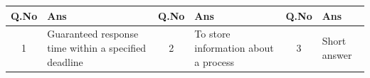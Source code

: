 \documentclass{article}
\begin{document}
\begin{table}[h]
\begin{tabular}{|c|>{\raggedright\arraybackslash}p{3cm}||c|>{\raggedright\arraybackslash}p{3cm}||c|>{\raggedright\arraybackslash}p{3cm}|}
\hline
\textbf{Q.No} & \textbf{Ans} & \textbf{Q.No} & \textbf{Ans} & \textbf{Q.No} & \textbf{Ans} \\
\hline
1 & Guaranteed response time within a specified deadline & 2 & To store information about a process & 3 & Short answer \\ \hline
\end{tabular}
\end{table}
\end{document}
